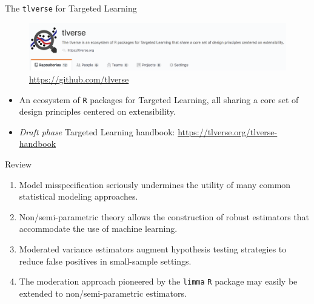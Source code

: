 \documentclass{beamer}
\begin{document}
\begin{frame}[c]{The \texttt{tlverse} for Targeted Learning}

\begin{figure}[H]
  \centering
  \includegraphics[width=\textwidth]{tlverse}
  \caption{
    \url{https://github.com/tlverse}
  }
\end{figure}
\begin{itemize}
  \itemsep12pt
  \item An ecosystem of \texttt{R} packages for Targeted Learning, all sharing a
    core set of design principles centered on extensibility.
  \item \textit{Draft phase} Targeted Learning handbook:
    \url{https://tlverse.org/tlverse-handbook}
\end{itemize}

\end{frame}



\begin{frame}[c]{Review}
\begin{center}
\begin{enumerate}
  \itemsep12pt
  \item Model misspecification seriously undermines the utility of many common
    statistical modeling approaches.
  \item Non/semi-parametric theory allows the construction of robust estimators
    that accommodate the use of machine learning.
  \item Moderated variance estimators augment hypothesis testing strategies to
    reduce false positives in small-sample settings.
  \item The moderation approach pioneered by the \texttt{limma} \texttt{R}
    package may easily be extended to non/semi-parametric estimators.
\end{enumerate}
\end{center}


\end{frame}

\end{document}

